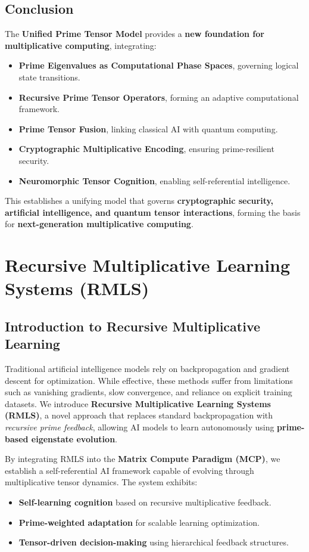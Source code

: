 \documentclass{article}
\theoremstyle{plain}
\theoremstyle{plain}
\theoremstyle{definition}
\theoremstyle{remark}
\begin{document}
\subsection{Conclusion}

The \textbf{Unified Prime Tensor Model} provides a \textbf{new foundation for multiplicative computing}, integrating:
\begin{itemize}
    \item \textbf{Prime Eigenvalues as Computational Phase Spaces}, governing logical state transitions.
    \item \textbf{Recursive Prime Tensor Operators}, forming an adaptive computational framework.
    \item \textbf{Prime Tensor Fusion}, linking classical AI with quantum computing.
    \item \textbf{Cryptographic Multiplicative Encoding}, ensuring prime-resilient security.
    \item \textbf{Neuromorphic Tensor Cognition}, enabling self-referential intelligence.
\end{itemize}

This establishes a unifying model that governs \textbf{cryptographic security, artificial intelligence, and quantum tensor interactions}, forming the basis for \textbf{next-generation multiplicative computing}.
\section{Recursive Multiplicative Learning Systems (RMLS)}

\subsection{Introduction to Recursive Multiplicative Learning}

Traditional artificial intelligence models rely on backpropagation and gradient descent for optimization. While effective, these methods suffer from limitations such as vanishing gradients, slow convergence, and reliance on explicit training datasets. We introduce \textbf{Recursive Multiplicative Learning Systems (RMLS)}, a novel approach that replaces standard backpropagation with \textit{recursive prime feedback}, allowing AI models to learn autonomously using \textbf{prime-based eigenstate evolution}.

By integrating RMLS into the \textbf{Matrix Compute Paradigm (MCP)}, we establish a self-referential AI framework capable of evolving through multiplicative tensor dynamics. The system exhibits:
\begin{itemize}
    \item \textbf{Self-learning cognition} based on recursive multiplicative feedback.
    \item \textbf{Prime-weighted adaptation} for scalable learning optimization.
    \item \textbf{Tensor-driven decision-making} using hierarchical feedback structures.
\end{itemize}
\end{document}

